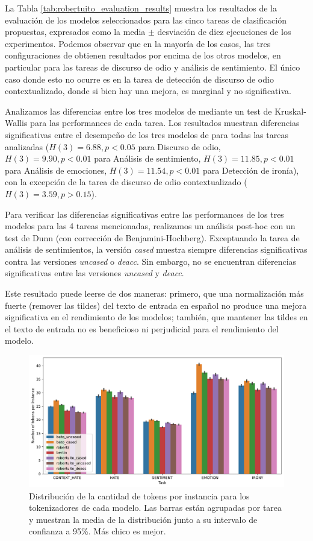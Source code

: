 La Tabla \ref{tab:robertuito_evaluation_results} muestra los resultados de la evaluación de los modelos seleccionados para las cinco tareas de clasificación propuestas, expresados como la media $\pm$ desviación de diez ejecuciones de los experimentos. Podemos observar que en la mayoría de los casos, las tres configuraciones de \robertuito{} obtienen resultados por encima de los otros modelos, en particular para las tareas de discurso de odio y análisis de sentimiento. El único caso donde esto no ocurre es en la tarea de detección de discurso de odio contextualizado, donde si bien hay una mejora, es marginal y no significativa.

Analizamos las diferencias entre los tres modelos de \robertuito{} mediante un test de Kruskal-Wallis \cite{kruskal1952use} para las performances de cada tarea. Los resultados muestran diferencias significativas entre el desempeño de los tres modelos de \robertuito{} para todas las tareas analizadas ($ H(3)=6.88, p<0.05$ para Discurso de odio, $H(3)=9.90, p<0.01$ para Análisis de sentimiento, $H(3)=11.85, p<0.01 $ para Análisis de emociones, $H(3)=11.54, p<0.01 $ para Detección de ironía), con la excepción de la tarea de discurso de odio contextualizado ($H(3)=3.59, p > 0.15$).

Para verificar las diferencias significativas entre las performances de los tres modelos para las 4 tareas mencionadas, realizamos un análisis post-hoc con un test de Dunn (con corrección de Benjamini-Hochberg). Exceptuando la tarea de análisis de sentimientos, la versión \emph{cased} muestra siempre diferencias significativas contra las versiones \emph{uncased} o \emph{deacc}. Sin embargo, no se encuentran diferencias significativas entre las versiones \emph{uncased} y \emph{deacc}.

Este resultado puede leerse de dos maneras: primero, que una normalización más fuerte (remover las tildes) del texto de entrada en español no produce una mejora significativa en el rendimiento de los modelos; también, que mantener las tildes en el texto de entrada no es beneficioso ni perjudicial para el rendimiento del modelo.

\begin{figure}
    \centering
    \includegraphics[width=\textwidth]{img/robertuito/length_tokens.pdf}
    \caption{Distribución de la cantidad de tokens por instancia para los tokenizadores de cada modelo. Las barras están agrupadas por tarea y muestran la media de la distribución junto a su intervalo de confianza a 95\%. Más chico es mejor.}
    \label{fig:length_tokens}
\end{figure}

